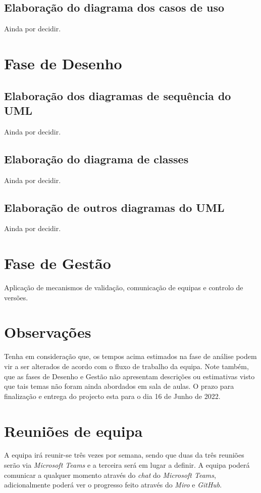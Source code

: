 \documentclass[a4paper]{article}
\begin{document}
\subsection{Elaboração do diagrama dos casos de uso}
Ainda por decidir.

\section{Fase de Desenho}
\subsection{Elaboração dos diagramas de sequência do UML}
Ainda por decidir.
\subsection{Elaboração do diagrama de classes}
Ainda por decidir.
\subsection{Elaboração de outros diagramas do UML}
Ainda por decidir.

\section{Fase de Gestão}
Aplicação de mecanismos de validação, comunicação de equipas e
controlo de versões.

\section{Observações}
Tenha em consideração que, os tempos acima estimados na fase de análise podem vir a ser alterados de acordo com o fluxo de trabalho da equipa. Note também, que as fases de Desenho e Gestão não apresentam descrições ou estimativas visto que tais temas não foram ainda abordados em sala de aulas.
O prazo para finalização e entrega do projecto esta para o dia 16 de Junho de 2022.

\section{Reuniões de equipa}
A equipa irá reunir-se três vezes por semana, sendo que duas da três reuniões serão via \textit{Microsoft Teams} e a terceira será em lugar a definir.
A equipa poderá comunicar a qualquer momento através do \textit{chat} do \textit{Microsoft Teams}, adicionalmente poderá ver o progresso feito através do \textit{Miro} e \textit{GitHub}.
\end{document}

